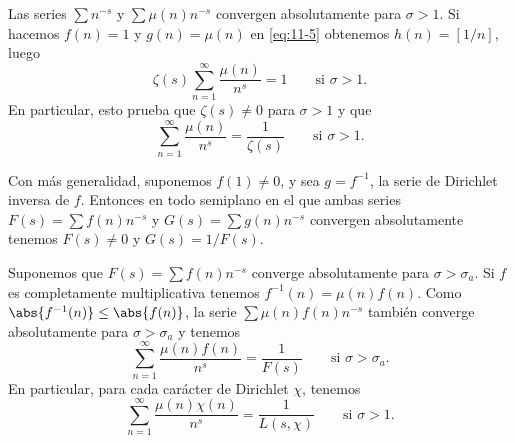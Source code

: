 \documentclass[12pt,a4paper]{book}
\begin{document}
    \begin{ejemplo}
        Las series $\sum n^{-s}$ y $\sum\mu(n)n^{-s}$ convergen absolutamente para
        $\sigma>1$. Si hacemos $f(n)=1$ y $g(n)=\mu(n)$ en \eqref{eq:11-5} obtenemos
        $h(n)=[1/n]$, luego
        \begin{equation*}
            \zeta(s)\sum_{n=1}^{\infty}\frac{\mu(n)}{n^{s}}=1\qquad\text{si }\sigma>1.
        \end{equation*}
        En particular, esto prueba que $\zeta(s)\neq0$ para $\sigma>1$ y que
        \begin{equation*}
            \sum_{n=1}^{\infty}\frac{\mu(n)}{n^{s}}=\frac{1}{\zeta(s)}\qquad\text{si }\sigma>1.
        \end{equation*}
    \end{ejemplo}

    \begin{ejemplo}
        Con más generalidad, suponemos $f(1)\neq0$, y sea $g=f^{-1}$, la serie de Dirichlet
        inversa de $f$. Entonces en todo semiplano en el que ambas series
        $F(s)=\sum f(n)n^{-s}$ y $G(s)=\sum g(n)n^{-s}$ convergen absolutamente tenemos
        $F(s)\neq0$ y $G(s)=1/F(s)$.
    \end{ejemplo}

    \begin{ejemplo}
        Suponemos que $F(s)=\sum f(n)n^{-s}$ converge absolutamente para $\sigma>\sigma_{a}$.
        Si $f$ es completamente multiplicativa tenemos $f^{-1}(n)=\mu(n)f(n)$. Como
        $\abs{f^{-1}(n)}\leq\abs{f(n)}$, la serie $\sum\mu(n)f(n)n^{-s}$ también converge
        absolutamente para $\sigma>\sigma_{a}$ y tenemos
        \begin{equation*}
            \sum_{n=1}^{\infty}\frac{\mu(n)f(n)}{n^{s}}=\frac{1}{F(s)}\qquad\text{si }\sigma>\sigma_{a}.
        \end{equation*}
        En particular, para cada carácter de Dirichlet $\chi$, tenemos
        \begin{equation*}
            \sum_{n=1}^{\infty}\frac{\mu(n)\chi(n)}{n^{s}}=\frac{1}{L(s,\chi)}\qquad\text{si }\sigma>1.
        \end{equation*}
    \end{ejemplo}
\end{document}
